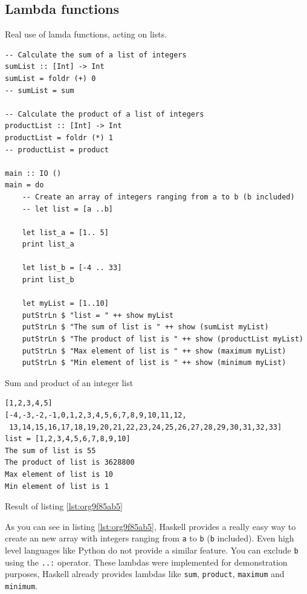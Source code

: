 \documentclass[a4paper, titlepage, twoside]{article}
\begin{document}
\subsection{Lambda functions}
\label{sec:org48098a3}

Real use of lamda functions, acting on lists.

\begin{listing}[htbp]
\begin{verbatim}
-- Calculate the sum of a list of integers
sumList :: [Int] -> Int
sumList = foldr (+) 0
-- sumList = sum
  
-- Calculate the product of a list of integers
productList :: [Int] -> Int
productList = foldr (*) 1
-- productList = product

main :: IO ()
main = do
    -- Create an array of integers ranging from a to b (b included)
    -- let list = [a ..b]

    let list_a = [1.. 5]
    print list_a

    let list_b = [-4 .. 33]
    print list_b

    let myList = [1..10]
    putStrLn $ "list = " ++ show myList
    putStrLn $ "The sum of list is " ++ show (sumList myList)
    putStrLn $ "The product of list is " ++ show (productList myList)
    putStrLn $ "Max element of list is " ++ show (maximum myList)
    putStrLn $ "Min element of list is " ++ show (minimum myList)
\end{verbatim}
\caption{\label{lst:org9f85ab5}Sum and product of an integer list}
\end{listing}

\begin{listing}[htbp]
\begin{verbatim}
[1,2,3,4,5]
[-4,-3,-2,-1,0,1,2,3,4,5,6,7,8,9,10,11,12,
 13,14,15,16,17,18,19,20,21,22,23,24,25,26,27,28,29,30,31,32,33]
list = [1,2,3,4,5,6,7,8,9,10]
The sum of list is 55
The product of list is 3628800
Max element of list is 10
Min element of list is 1
\end{verbatim}
\caption{Result of listing \ref{lst:org9f85ab5}}
\end{listing}

As you can see in listing \ref{lst:org9f85ab5}, Haskell provides a really easy way to create an new array with integers ranging from \texttt{a} to \texttt{b} (\texttt{b} included). Even high level languages like Python do not provide a similar feature. You can exclude \texttt{b} using the \texttt{..:} operator. These lambdas were implemented for demonstration purposes, Haskell already provides lambdas like \texttt{sum}, \texttt{product}, \texttt{maximum} and \texttt{minimum}.
\end{document}
